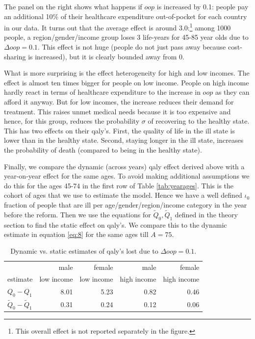 \documentclass[a4paper,12pt]{article}
\begin{document}
The panel on the right shows what happens if \(oop\) is increased by 0.1: people pay an additional 10\% of their healthcare expenditure out-of-pocket for each country in our data. It turns out that the average effect is around 3.0:\footnote{This overall effect is not reported separately in the figure.} among 1000 people, a region/gender/income group loses 3 life-years for 45-85 year olds due to \(\Delta oop=0.1\). This effect is not huge (people do not just pass away because cost-sharing is increased), but it is clearly bounded away from 0.

What is more surprising is the effect heterogeneity for high and low incomes. The effect is almost ten times bigger for people on low income. People on high income hardly react in terms of healthcare expenditure to the increase in \(oop\) as they can afford it anyway. But for low incomes, the increase reduces their demand for treatment. This raises unmet medical needs because it is too expensive and hence, for this group, reduces the probability \(\sigma\) of recovering to the healthy state. This has two effects on their qaly's. First, the quality of life in the ill state is lower than in the healthy state. Second, staying longer in the ill state, increases the probability of death (compared to being in the healthy state).


Finally, we compare the dynamic (across years) qaly effect derived above with a year-on-year effect for the same ages. To avoid making additional assumptions we do this for the ages 45-74 in the first row of Table \ref{tab:yearages}. This is the cohort of ages that we use to estimate the model. Hence we have a well defined \(\iota_0\) fraction of people that are ill per age/gender/region/income category in the year before the reform. Then we use the equations for \(\tilde Q_0, \tilde Q_1\) defined in the theory section to find the static effect on qaly's. We compare this to the dynamic estimate in equation \eqref{eq:8} for the same ages till \(A=75\).


\begin{table}[htbp]
\caption{\label{tab:dynamic_static}Dynamic vs. static estimates of qaly's lost due to \(\Delta oop = 0.1\).}
\centering
\begin{tabular}{lrrrr}
 & male & female & male & female\\
estimate & low income & low income & high income & high income\\
\hline
\(Q_0 - Q_1\) & 8.01 & 5.23 & 0.82 & 0.46\\
\(\tilde Q_0 - \tilde Q_1\) & 0.31 & 0.24 & 0.12 & 0.06\\
\end{tabular}
\end{table}
\end{document}

